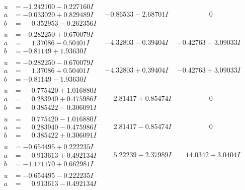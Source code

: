 \documentclass[1p]{elsarticle_modified}
\theoremstyle{definition}
\begin{document}
$$\begin{array}{c|c|c}
 \hline 
\begin{aligned}
u &= -1.242100 - 0.227160 I \\
a &= -0.033020 + 0.829489 I \\
b &= \phantom{-}0.352953 - 0.262356 I\end{aligned}
 & -0.86533 - 2.68701 I & \phantom{-0.000000 } 0 \\ \hline\begin{aligned}
u &= -0.282250 + 0.670079 I \\
a &= \phantom{-}1.37086 - 0.50401 I \\
b &= -0.81149 + 1.93630 I\end{aligned}
 & -4.32803 - 0.39404 I & -0.42763 - 3.09033 I \\ \hline\begin{aligned}
u &= -0.282250 - 0.670079 I \\
a &= \phantom{-}1.37086 + 0.50401 I \\
b &= -0.81149 - 1.93630 I\end{aligned}
 & -4.32803 + 0.39404 I & -0.42763 + 3.09033 I \\ \hline\begin{aligned}
u &= \phantom{-}0.775420 + 1.016880 I \\
a &= \phantom{-}0.283940 + 0.475986 I \\
b &= \phantom{-}0.385422 - 0.306091 I\end{aligned}
 & \phantom{-}2.81417 + 0.85474 I & \phantom{-0.000000 } 0 \\ \hline\begin{aligned}
u &= \phantom{-}0.775420 - 1.016880 I \\
a &= \phantom{-}0.283940 - 0.475986 I \\
b &= \phantom{-}0.385422 + 0.306091 I\end{aligned}
 & \phantom{-}2.81417 - 0.85474 I & \phantom{-0.000000 } 0 \\ \hline\begin{aligned}
u &= -0.654495 + 0.222235 I \\
a &= \phantom{-}0.913613 + 0.492134 I \\
b &= -1.171170 + 0.662981 I\end{aligned}
 & \phantom{-}5.22239 - 2.37989 I & \phantom{-}14.0342 + 3.0404 I \\ \hline\begin{aligned}
u &= -0.654495 - 0.222235 I \\
a &= \phantom{-}0.913613 - 0.492134 I \\

\end{aligned}
\end{array}$$
\end{document}
